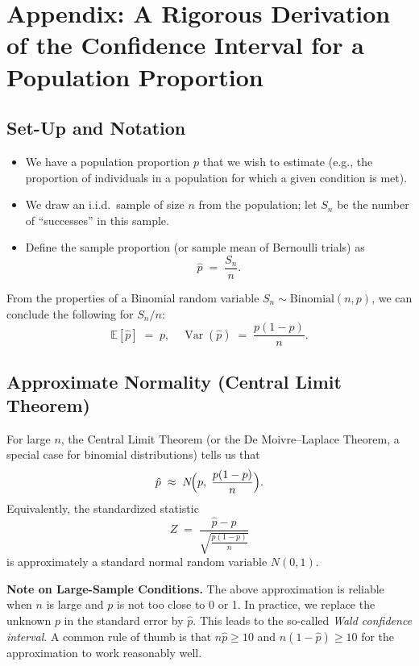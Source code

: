 \documentclass[11pt]{article}
\begin{document}
\newpage
\appendix


\section*{Appendix: A Rigorous Derivation of the Confidence Interval for a Population Proportion}
\subsection*{Set-Up and Notation}

\begin{itemize}
  \item We have a population proportion \(p\) that we wish to estimate (e.g., the proportion of individuals in a population for which a given condition is met).
  \item We draw an i.i.d.\ sample of size \(n\) from the population; let \(S_n\) be the number of ``successes'' in this sample.
  \item Define the sample proportion (or sample mean of Bernoulli trials) as
  \[
    \hat{p} \;=\; \frac{S_n}{n}.
  \]
\end{itemize}

From the properties of a Binomial random variable \(S_n \sim \mathrm{Binomial}(n,p)\), we can conclude the following for $S_n/n$:
\[
  \mathbb{E}[\hat{p}] \;=\; p,
  \quad
  \operatorname{Var}(\hat{p}) \;=\; \frac{p(1-p)}{n}.
\]

\subsection*{Approximate Normality (Central Limit Theorem)}

For large \(n\), the Central Limit Theorem (or the De Moivre--Laplace Theorem, a special case for binomial distributions) tells us that
\[
  \hat{p} \;\approx\; N\!\Bigl(p,\;\frac{p(1-p)}{n}\Bigr).
\]
Equivalently, the standardized statistic
\[
  Z \;=\; \frac{\hat{p} - p}{\sqrt{\frac{p(1-p)}{n}}}
\]
is approximately a standard normal random variable \(N(0,1)\).

\textbf{Note on Large-Sample Conditions.}
The above approximation is reliable when \(n\) is large and \(p\) is not too close to 0 or 1. In practice, we replace the unknown \(p\) in the standard error by \(\hat{p}\). This leads to the so-called \emph{Wald confidence interval}. A common rule of thumb is that \(n\hat{p} \ge 10\) and \(n(1 - \hat{p}) \ge 10\) for the approximation to work reasonably well.
\end{document}
